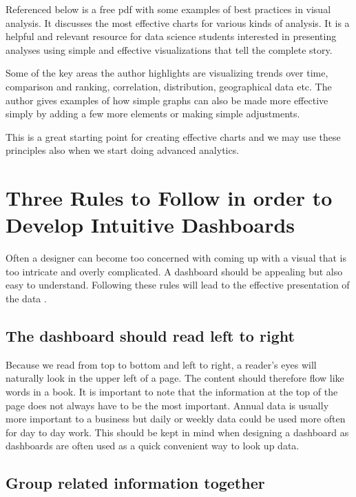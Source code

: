 \documentclass[]{book}
\theoremstyle{definition}
\theoremstyle{definition}
\theoremstyle{definition}
\theoremstyle{remark}
\begin{document}
Referenced below is a free pdf with some examples of best practices in
visual analysis. It discusses the most effective charts for various
kinds of analysis. It is a helpful and relevant resource for data
science students interested in presenting analyses using simple and
effective visualizations that tell the complete story.

Some of the key areas the author highlights are visualizing trends over
time, comparison and ranking, correlation, distribution, geographical
data etc. The author gives examples of how simple graphs can also be
made more effective simply by adding a few more elements or making
simple adjustments.

This is a great starting point for creating effective charts and we may
use these principles also when we start doing advanced analytics.

\section{Three Rules to Follow in order to Develop Intuitive
Dashboards}\label{three-rules-to-follow-in-order-to-develop-intuitive-dashboards}

Often a designer can become too concerned with coming up with a visual
that is too intricate and overly complicated. A dashboard should be
appealing but also easy to understand. Following these rules will lead
to the effective presentation of the data \citep{intuitive-dash}.

\subsection{The dashboard should read left to
right}\label{the-dashboard-should-read-left-to-right}

Because we read from top to bottom and left to right, a reader's eyes
will naturally look in the upper left of a page. The content should
therefore flow like words in a book. It is important to note that the
information at the top of the page does not always have to be the most
important. Annual data is usually more important to a business but daily
or weekly data could be used more often for day to day work. This should
be kept in mind when designing a dashboard as dashboards are often used
as a quick convenient way to look up data.

\subsection{Group related information
together}\label{group-related-information-together}
\end{document}
